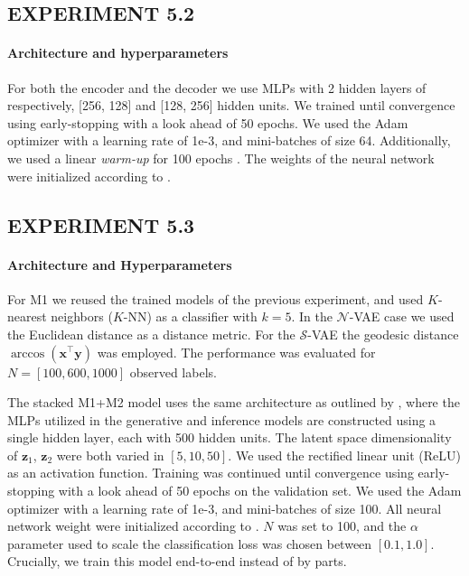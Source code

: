 \documentclass[letterpaper]{article}
\newcommand{\Sv}{$\mathcal{S}$}
\newcommand{\x}{\mathbf{x}}
\newcommand{\y}{\mathbf{y}}
\newcommand{\z}{\mathbf{z}}
\begin{document}
\subsection{EXPERIMENT 5.2}
\paragraph{Architecture and hyperparameters} For both the encoder and the decoder we use MLPs with 2 hidden layers of respectively, [256, 128] and [128, 256] hidden units. We trained until convergence using early-stopping with a look ahead of 50 epochs. We used the Adam optimizer \citep{kingma2014adam} with a learning rate of 1e-3, and mini-batches of size 64. Additionally, we used a linear \textit{warm-up} for 100 epochs \citep{bowman2015generating}. The weights of the neural network were initialized according to \citep{glorot2010understanding}.

\subsection{EXPERIMENT 5.3}
\paragraph{Architecture and Hyperparameters}
For M1 we reused the trained models of the previous experiment, and used $K$-nearest neighbors ($K$-NN) as a classifier with $k=5$. In the $\mathcal{N}$-VAE case we used the Euclidean distance as a distance metric. For the \Sv-VAE the geodesic distance $\arccos(\x^{\top} \y)$ was employed. The performance was evaluated for $N = [100, 600, 1000]$ observed labels.

The stacked M1+M2 model uses the same architecture as outlined by \cite{kingma-semi-super}, where the MLPs utilized in the generative and inference models are constructed using a single hidden layer, each with 500 hidden units. The latent space dimensionality of $\z_1$, $\z_2$ were both varied in $[5, 10, 50]$. We used the rectified linear unit (ReLU) as an activation function. Training was continued until convergence using early-stopping with a look ahead of 50 epochs on the validation set. We used the Adam optimizer with a learning rate of 1e-3, and mini-batches of size 100. All neural network weight were initialized according to \citep{glorot2010understanding}. $N$ was set to 100, and the $\alpha$ parameter used to scale the classification loss was chosen between $[0.1, 1.0]$. Crucially, we train this model end-to-end instead of by parts.
\end{document}
